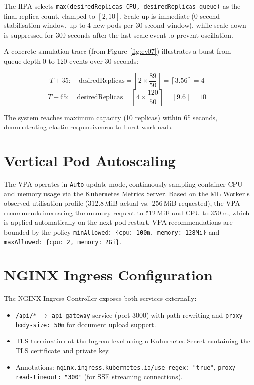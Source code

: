 \documentclass[12pt,a4paper]{report}
\begin{document}
The HPA selects \texttt{max(desiredReplicas\_{CPU},
desiredReplicas\_{queue})} as the final replica count, clamped to
$[2, 10]$. Scale-up is immediate (0-second stabilisation window, up to 4 new
pods per 30-second window), while scale-down is suppressed for 300 seconds
after the last scale event to prevent oscillation.

A concrete simulation trace (from Figure~\ref{fig:ev07}) illustrates a burst
from queue depth 0 to 120 events over 30 seconds:

\[
  T{+}35: \quad \text{desiredReplicas} =
  \left\lceil 2 \times \frac{89}{50} \right\rceil = \left\lceil 3.56 \right\rceil = 4
\]
\[
  T{+}65: \quad \text{desiredReplicas} =
  \left\lceil 4 \times \frac{120}{50} \right\rceil = \left\lceil 9.6 \right\rceil = 10
\]

The system reaches maximum capacity (10 replicas) within 65 seconds,
demonstrating elastic responsiveness to burst workloads.

\section{Vertical Pod Autoscaling}

The VPA operates in \texttt{Auto} update mode, continuously sampling container
CPU and memory usage via the Kubernetes Metrics Server. Based on the ML Worker's
observed utilisation profile (312.8\,MiB actual vs.\ 256\,MiB requested), the
VPA recommends increasing the memory request to 512\,MiB and CPU to 350\,m,
which is applied automatically on the next pod restart. VPA recommendations are
bounded by the policy \texttt{minAllowed: \{cpu: 100m, memory: 128Mi\}} and
\texttt{maxAllowed: \{cpu: 2, memory: 2Gi\}}.

\section{NGINX Ingress Configuration}

The NGINX Ingress Controller exposes both services externally:
\begin{itemize}[leftmargin=1.5cm]
  \item \texttt{/api/*} $\rightarrow$ \texttt{api-gateway} service (port 3000)
        with path rewriting and \texttt{proxy-body-size: 50m} for document
        upload support.
  \item TLS termination at the Ingress level using a Kubernetes Secret containing
        the TLS certificate and private key.
  \item Annotations: \texttt{nginx.ingress.kubernetes.io/use-regex: "true"},
        \texttt{proxy-read-timeout: "300"} (for SSE streaming connections).
\end{itemize}
\end{document}
